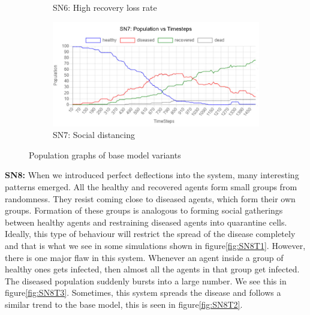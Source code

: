 \documentclass[a4paper,11pt]{article}
\begin{document}
\begin{figure}[H]
\begin{subfigure}[b]{0.49\linewidth}
            \caption{SN6: High recovery loss rate}
            \label{fig:SN6}
        \end{subfigure}
        \begin{subfigure}[b]{0.49\linewidth}
            \includegraphics[width=\linewidth]{pop_graphs/SN7_pop.jpg}
            \caption{SN7: Social distancing}
            \label{fig:SN7}
        \end{subfigure}
        \caption{Population graphs of base model variants}
    \end{figure}

    \textbf{SN8:} When we introduced perfect deflections into the system, many interesting patterns emerged.
    All the healthy and recovered agents form small groups from randomness.
    They resist coming close to diseased agents, which form their own groups.
    Formation of these groups is analogous to forming social gatherings between healthy agents and restraining diseased agents into quarantine cells.
    Ideally, this type of behaviour will restrict the spread of the disease completely and that is what we see in some simulations shown in figure\ref{fig:SN8T1}.
    However, there is one major flaw in this system.
    Whenever an agent inside a group of healthy ones gets infected, then almost all the agents in that group get infected.
    The diseased population suddenly bursts into a large number.
    We see this in figure\ref{fig:SN8T3}.
    Sometimes, this system spreads the disease and follows a similar trend to the base model, this is seen in figure\ref{fig:SN8T2}.
\end{document}
